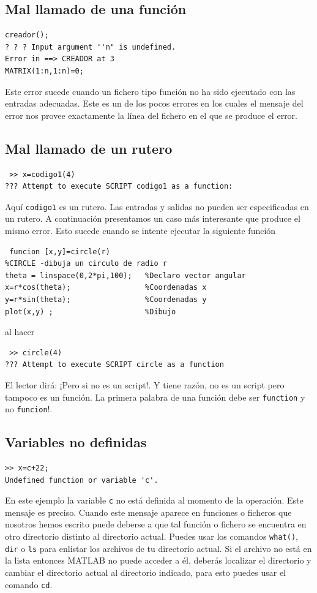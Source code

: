 \documentclass[11pt]{article}
\begin{document}
\subsection{Mal llamado de una funci\'on}
\begin{verbatim}
creador();
? ? ? Input argument ''n" is undefined.
Error in ==> CREADOR at 3
MATRIX(1:n,1:n)=0;
\end{verbatim}
Este error sucede cuando un fichero tipo funci\'on no ha sido ejecutado con 
las entradas adecuadas. Este es un de los pocos errores en los cuales el mensaje 
del error nos provee exactamente la l\'inea del fichero en el que se produce el error.

\subsection{Mal llamado de un rutero}
\begin{verbatim}
 >> x=codigo1(4)
??? Attempt to execute SCRIPT codigo1 as a function:
\end{verbatim}
Aqu\'i \texttt{codigo1} es un rutero. Las entradas y salidas no pueden 
ser especificadas en un rutero. A continuaci\'on presentamos un caso 
m\'as interesante que produce el mismo error. Esto sucede cuando se intente 
ejecutar la siguiente funci\'on
\begin{verbatim}
 funcion [x,y]=circle(r) 
%CIRCLE -dibuja un circulo de radio r
theta = linspace(0,2*pi,100);   %Declaro vector angular
x=r*cos(theta);                 %Coordenadas x
y=r*sin(theta);                 %Coordenadas y
plot(x,y) ;                     %Dibujo
\end{verbatim}
al hacer
\begin{verbatim}
 >> circle(4)
??? Attempt to execute SCRIPT circle as a function
\end{verbatim}
El lector dir\'a: ¡Pero si no es un script!. Y tiene raz\'on, no es un script 
pero tampoco es un funci\'on. La primera palabra de una funci\'on debe ser 
\texttt{function} y no \texttt{funcion}!.

\subsection{Variables no definidas}
\begin{verbatim}
>> x=c+22;
Undefined function or variable 'c'.
\end{verbatim}
En este ejemplo la variable \texttt{c} no est\'a definida al momento de la operaci\'on. Este 
mensaje es preciso. Cuando este mensaje aparece en funciones o ficheros que nosotros hemos escrito puede 
deberse a que tal funci\'on o fichero se encuentra en otro directorio distinto 
al directorio actual. Puedes usar los comandos \texttt{what()}, \texttt{dir} o \texttt{ls} para 
enlistar los archivos de tu directorio actual. Si el archivo no est\'a en la lista 
entonces MATLAB no puede acceder a \'el, deber\'as localizar el directorio y cambiar 
el directorio actual al directorio indicado, para esto puedes usar el comando \texttt{cd}.
%
\end{document}
